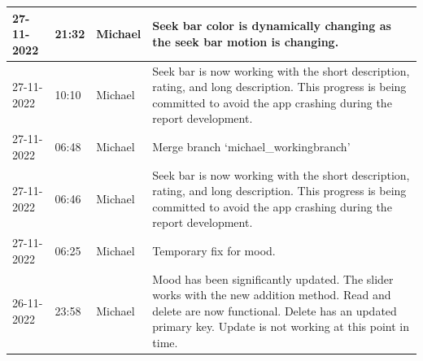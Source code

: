 \documentclass[11pt]{article}
\begin{document}
\begin{center}
\begin{longtable}{|p{2cm}|l|p{2cm}|p{10.5cm}|}
            27-11-2022                                 & 21:32                              & Michael                                 & Seek bar color is dynamically changing as the seek bar motion is changing.                                                                                                                                                                                                                                   \\ \hline
            27-11-2022                                 & 10:10                              & Michael                                 & Seek bar is now working with the short description, rating, and long description. This progress is being committed to avoid the app crashing during the report development.                                                                                                                                  \\ \hline
            27-11-2022                                 & 06:48                              & Michael                                 & Merge branch `michael\_workingbranch'                                                                                                                                                                                                                                                                        \\ \hline
            27-11-2022                                 & 06:46                              & Michael                                 & Seek bar is now working with the short description, rating, and long description. This progress is being committed to avoid the app crashing during the report development.                                                                                                                                  \\ \hline
            27-11-2022                                 & 06:25                              & Michael                                 & Temporary fix for mood.                                                                                                                                                                                                                                                                                      \\ \hline
            26-11-2022                                 & 23:58                              & Michael                                 & Mood has been significantly updated. The slider works with the new addition method. Read and delete are now functional. Delete has an updated primary key. Update is not working at this point in time.                                                                                                      \\ \hline

\end{longtable}
\end{center}
\end{document}
